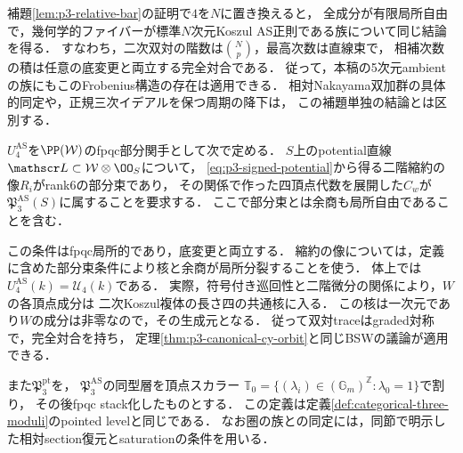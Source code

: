 \begin{remark}[相対bar補題の次元に依存しない部分]
\label{rem:relative-bar-general-dimension}
補題\ref{lem:p3-relative-bar}の証明で$4$を$N$に置き換えると，
全成分が有限局所自由で，幾何学的ファイバーが標準$N$次元Koszul
AS正則である族について同じ結論を得る．
すなわち，二次双対の階数は$\binom Np$，最高次数は直線束で，
相補次数の積は任意の底変更と両立する完全対合である．
従って，本稿の5次元ambientの族にもこのFrobenius構造の存在は適用できる．
相対Nakayama双加群の具体的同定や，正規三次イデアルを保つ周期の降下は，
この補題単独の結論とは区別する．
\end{remark}

\begin{definition}[相対許容potential関手]
\label{def:p3-relative-potential-functor}
$U_4^{\mathrm{AS}}$を$\PP(\mathcal W)$のfpqc部分関手として次で定める．
$S$上のpotential直線$\mathscr L\subset\mathcal W\otimes\OO_S$について，
\eqref{eq:p3-signed-potential}から得る二階縮約の像$R_i$がrank6の部分束であり，
その関係で作った四頂点代数を展開した$C_w$が
$\mathfrak P_3^{\mathrm{AS}}(S)$に属することを要求する．
ここで部分束とは余商も局所自由であることを含む．
\end{definition}

この条件はfpqc局所的であり，底変更と両立する．
縮約の像については，定義に含めた部分束条件により核と余商が局所分裂することを使う．
体上では$U_4^{\mathrm{AS}}(k)=\mathcal U_4(k)$である．
実際，符号付き巡回性と二階微分の関係により，$W$の各頂点成分は
二次Koszul複体の長さ四の共通核に入る．
この核は一次元であり$W$の成分は非零なので，その生成元となる．
従って双対traceはgraded対称で，完全対合を持ち，
定理\ref{thm:p3-canonical-cy-orbit}と同じBSWの議論が適用できる．

また$\mathfrak P_3^{\mathrm{pt}}$を，
$\mathfrak P_3^{\mathrm{AS}}$の同型層を頂点スカラー
$\mathbb T_0=\{(\lambda_i)\in(\mathbb G_m)^{\mathbb Z}:\lambda_0=1\}$で割り，
その後fpqc stack化したものとする．
この定義は定義\ref{def:categorical-three-moduli}のpointed levelと同じである．
なお圏の族との同定には，同節で明示した相対section復元とsaturationの条件を用いる．

